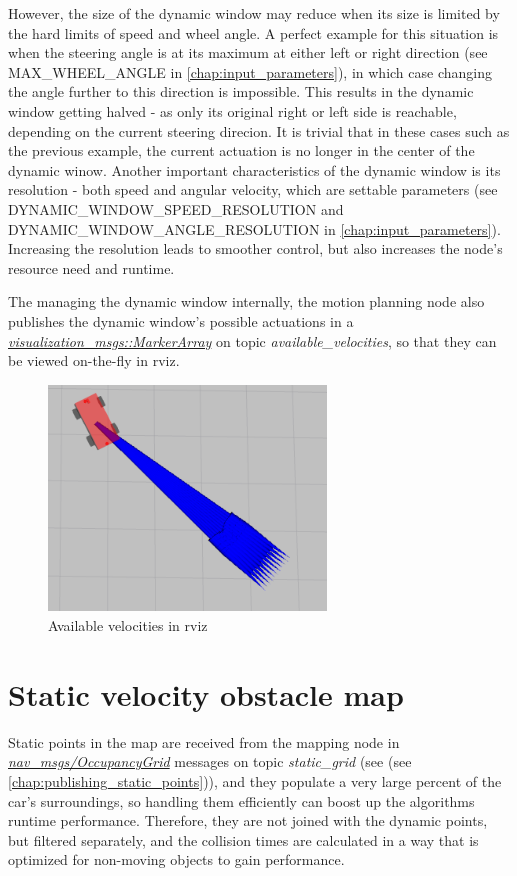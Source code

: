 However, the size of the dynamic window may reduce when its size is limited by the hard limits of speed and wheel angle. A perfect example for this situation is when the steering angle is at its maximum at either left or right direction (see MAX\_WHEEL\_ANGLE in \ref{chap:input_parameters}), in which case changing the angle further to this direction is impossible. This results in the dynamic window getting halved - as only its original right or left side is reachable, depending on the current steering direcion. It is trivial that in these cases such as the previous example, the current actuation is no longer in the center of the dynamic winow.
Another important characteristics of the dynamic window is its resolution - both speed and angular velocity, which are settable parameters (see DYNAMIC\_WINDOW\_SPEED\_RESOLUTION and DYNAMIC\_WINDOW\_ANGLE\_RESOLUTION in \ref{chap:input_parameters}). Increasing the resolution leads to smoother control, but also increases the node's resource need and runtime.

The managing the dynamic window internally, the motion planning node also publishes the dynamic window's possible actuations in a \href{http://docs.ros.org/melodic/api/visualization_msgs/html/msg/MarkerArray.html}{\textit{visualization\_msgs::MarkerArray}} on topic \textit{available\_velocities}, so that they can be viewed on-the-fly in rviz.

\begin{figure}[!ht]
    \centering
    \includegraphics[height=60mm]{figures/raw/rviz_available_velocities.png}
    \caption{Available velocities in rviz}
    \label{rviz_available_velocities}
\end{figure}

\section{Static velocity obstacle map}
\label{chap:static_velocity_obstacle_map}
Static points in the map are received from the mapping node in \href{http://docs.ros.org/melodic/api/nav_msgs/html/msg/OccupancyGrid.html}{\textit{nav\_msgs/OccupancyGrid}} messages on topic \textit{static\_grid} (see (see \ref{chap:publishing_static_points})), and they populate a very large percent of the car's surroundings, so handling them efficiently can boost up the algorithms runtime performance. Therefore, they are not joined with the dynamic points, but filtered separately, and the collision times are calculated in a way that is optimized for non-moving objects to gain performance.

